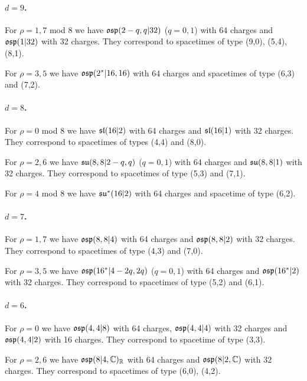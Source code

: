 \documentclass[a4paper,12pt]{article}
\begin{document}
\paragraph{$d=9$.} For $\rho=1,7$ mod 8 we have $\mathfrak{osp}(2-q,q|32)$
($q=0,1$) with 64 charges  and  $\mathfrak{osp}(1|32)$ with 32 charges.
They correspond to   spacetimes of type (9,0), (5,4), (8,1).

\smallskip

\noindent For $\rho=3,5$ we have $\mathfrak{osp}(2^*|16,16)$ with 64
charges and spacetimes of type (6,3) and (7,2).


\paragraph{$d=8$.} For $\rho=0$ mod 8 we have $\mathfrak{sl}(16|2)$ with 64 charges
and  $\mathfrak{sl}(16|1)$ with 32 charges. They correspond to  spacetimes
of types (4,4) and (8,0).

\smallskip

\noindent For $\rho=2,6$ we have $\mathfrak{su}(8,8|2-q,q)$ ($q=0,1$) with
64 charges and $\mathfrak{su}(8,8|1)$ with 32 charges. They correspond to
 spacetimes of type (5,3) and (7,1).

\smallskip

\noindent For $\rho=4$ mod 8 we have $\mathfrak{su}^*(16|2)$ with 64
charges and spacetime of type (6,2).

\paragraph{$d=7$.}For $\rho=1,7$ we have $\mathfrak{osp}(8,8|4)$ with 64
charges and $\mathfrak{osp}(8,8|2)$ with 32 charges. They correspond to
spacetimes of type (4,3) and (7,0).

\smallskip

\noindent  For $\rho=3,5$ we have $\mathfrak{osp}(16^*|4-2q,2q)$ ($q=0,1$)
with 64 charges and $\mathfrak{osp}(16^*|2)$ with 32 charges. They
correspond to  spacetimes of type (5,2) and (6,1).

\paragraph{$d=6$.} For $\rho=0$ we have $\mathfrak{osp}(4,4|8)$ with 64
charges, $\mathfrak{osp}(4,4|4)$ with 32 charges and $\mathfrak{osp}(4,4|2)$ with 16
charges. They correspond to spacetime of type (3,3).

\smallskip

\noindent For $\rho=2,6$ we have $\mathfrak{osp}(8|4,\mathbb{C})_{\mathbb{R}}$ with 64
charges and $\mathfrak{osp}(8|2,\mathbb{C})$ with 32 charges. They correspond to
spacetimes of type (6,0), (4,2).
\end{document}
